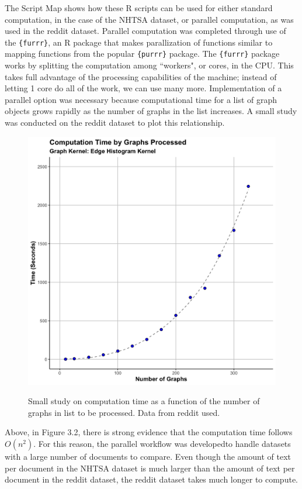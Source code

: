  The Script Map shows how these R scripts can be used for either standard computation, in the case of the NHTSA dataset, or parallel computation, as was used in the reddit dataset. Parallel computation was completed through use of the \texttt{\{furrr\}}, an R package that makes parallization of functions similar to mapping functions from the popular \texttt{\{purrr\}} package. The \texttt{\{furrr\}} package works by splitting the computation among ``workers", or cores, in the CPU. This takes full advantage of the processing capabilities of the machine; instead of letting 1 core do all of the work, we can use many more. Implementation of a parallel option was necessary because computational time for a list of graph objects grows rapidly as the number of graphs in the list increases. A small study was conducted on the reddit dataset to plot this relationship.\\
 
\begin{figure}
\includegraphics[width=6in]{Content/Images/edgeHistTimePlot.png}\\
\caption{Small study on computation time as a function of the number of graphs in list to be processed. Data from reddit used.}
\end{figure}
 
Above, in Figure 3.2, there is strong evidence that the computation time follows $O(n^2)$. For this reason, the parallel workflow was developed\textemdash to handle datasets with a large number of documents to compare. Even though the amount of text per document in the NHTSA dataset is much larger than the amount of text per document in the reddit dataset, the reddit dataset takes much longer to compute. \\

